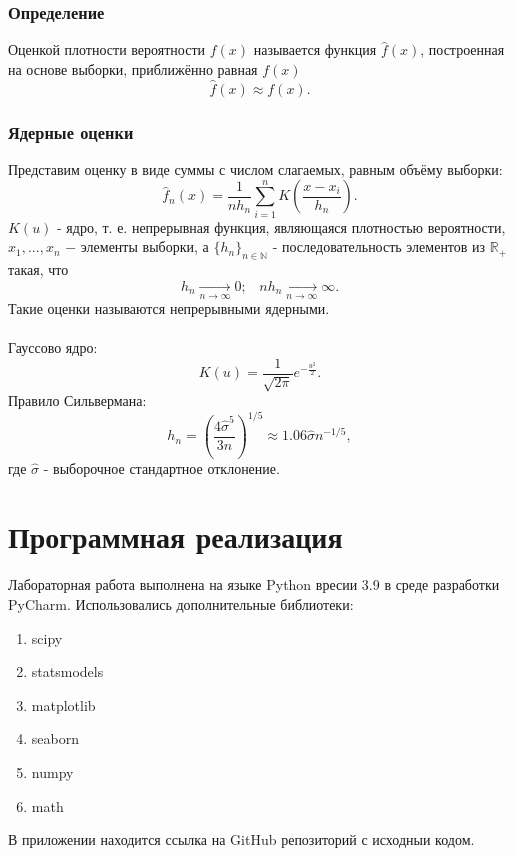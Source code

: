 \documentclass{article}
\begin{document}
\subsubsection{Определение}
\noindent Оценкой плотности вероятности $f(x)$ называется функция $\widehat{f}(x)$, построенная на основе выборки, приближённо равная $f(x)$
\begin{equation}
    \widehat{f}(x)\approx f(x).
\end{equation}
\subsubsection{Ядерные оценки}
\noindent Представим оценку в виде суммы с числом слагаемых, равным объёму выборки:
\begin{equation}
    \widehat{f}_n(x)=\frac{1}{n h_n}\sum_{i=1}^n K\left(\frac{x-x_i}{h_n}\right).
\end{equation}
$K(u)$ - ядро, т. е. непрерывная функция, являющаяся плотностью вероятности, $x_1,...,x_n$ $-$ элементы выборки, а $\{h_n\}_{n\in\mathbb{N}}$ - последовательность элементов из $\mathbb{R}_+$ такая, что
\begin{equation}
    h_n\xrightarrow[n\to\infty]{}0;\;\;\;n h_n\xrightarrow[n\to\infty]{}\infty.
\end{equation}
Такие оценки называются непрерывными ядерными.\\\\
Гауссово ядро:
\begin{equation}
    K(u)=\frac{1}{\sqrt{2\pi}}e^{-\frac{u^2}{2}}.
\end{equation}
Правило Сильвермана:
\begin{equation}
    h_n=\left(\frac{4\hat{\sigma}^5}{3n}\right)^{1/5}\approx1.06\hat{\sigma}n^{-1/5},
\end{equation}
где $\hat{\sigma}$ - выборочное стандартное отклонение.

\section {Программная реализация} 	
\noindent Лабораторная работа выполнена на языке Python вресии 3.9 в среде разработки PyCharm. Использовались дополнительные библиотеки:
 \begin{enumerate}
        \item scipy
        \item statsmodels
        \item matplotlib
        \item seaborn
        \item numpy
        \item math
    \end{enumerate}
В приложении находится ссылка на GitHub репозиторий с исходныи кодом.
\end{document}
